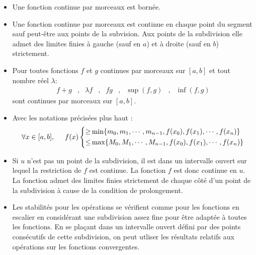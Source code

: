 \begin{propn}
\begin{itemize}
\item Une fonction continue par morceaux est bornée.
\item Une fonction continue par morceaux est continue en chaque point du segment sauf peut-être aux points de la subvision. Aux points de la subdivision elle admet  des limites finies à gauche (sauf en $a$) et à droite (sauf en $b$) strictement.
 \item Pour toutes fonctions $f$ et $g$ continues par morceaux sur $[a,b]$  et tout nombre réel $\lambda$:
\begin{align*}
 f + g &,& \lambda f &,& f g &,& \sup(f, g) &,& \inf(f,g)
\end{align*}
sont  continues par morceaux sur $[a,b]$.
\end{itemize}
\end{propn}
\begin{demo}
 \begin{itemize}
 \item Avec les notations précisées plus haut :
\begin{displaymath}
 \forall x\in[a,b], \hspace{0.5cm} f(x) 
\left\lbrace  
\begin{aligned}
  \geq& \min \{m_0,m_1,\cdots ,m_{n-1},f(x_0),f(x_1),\cdots ,f(x_n)\} \\
  \leq& \max \{M_0,M_1,\cdots ,M_{n-1},f(x_0),f(x_1),\cdots ,f(x_n)\}
\end{aligned}
\right. 
\end{displaymath}
\item Si $u$ n'est pas un point de la subdivision, il est dans un intervalle ouvert sur lequel la restriction de $f$ est continue. La fonction $f$ est donc continue en $u$. La fonction admet des limites finies strictement de chaque côté d'un point de la subdivision à cause de la condition de prolongement.
\item Les stabilités pour les opérations se vérifient comme pour les fonctions en escalier en considérant une subdivision assez fine pour être adaptée à toutes les fonctions. En se plaçant dans un intervalle ouvert défini par des points consécutifs de cette subdivision, on peut utliser les résultats relatifs aux opérations sur les fonctions convergentes.
\end{itemize}
\end{demo}
